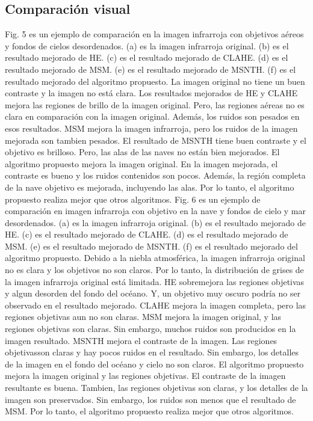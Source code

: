 \documentclass[a4paper, 11 pt, conference]{ieeeconf}      %
\begin{document}
\subsection{Comparaci\'on visual}
Fig. 5 es un ejemplo de comparaci\'on en la imagen infrarroja con objetivos a\'ereos y fondos de cielos desordenados. (a) es la imagen infrarroja original. (b) es el resultado mejorado de HE. (c) es el resultado mejorado de CLAHE. (d) es el resultado mejorado de MSM. (e) es el resultado mejorado de MSNTH. (f) es el resultado mejorado del algoritmo propuesto. La imagen original no tiene un buen contraste y la imagen no est\'a clara. Los resultados mejorados de HE y CLAHE mejora las regiones de brillo de la imagen original. Pero, las regiones a\'ereas no es clara en comparaci\'on con la imagen original. Adem\'as, los ruidos son pesados en esos resultados. MSM mejora la imagen infrarroja, pero los ruidos de la imagen mejorada son tambien pesados. El resultado de MSNTH tiene buen  contraste y el objetivo es brilloso. Pero, las alas de las naves no est\'an bien mejorados. El algoritmo propuesto mejora la imagen original. En la imagen mejorada, el contraste es bueno y los ruidos contenidos son pocos. Adem\'as, la regi\'on completa de la nave objetivo es mejorada, incluyendo las alas. Por lo tanto, el algoritmo propuesto realiza mejor que otros algoritmos.
Fig. 6 es un ejemplo de comparaci\'on en imagen infrarroja con objetivo en la nave y fondos de cielo y mar desordenados. (a) es la imagen infrarroja original. (b) es el resultado mejorado de HE. (c) es el resultado mejorado de CLAHE. (d) es el resultado mejorado de MSM. (e) es el resultado mejorado de MSNTH. (f) es el resultado mejorado del algoritmo propuesto. Debido a la niebla atmosf\'erica, la imagen infrarroja original no es clara y los objetivos no son claros. Por lo tanto, la distribuci\'on de grises de la imagen infrarroja original est\'a limitada. HE sobremejora las regiones objetivas y algun desorden del fondo del oc\'eano. Y, un objetivo muy oscuro podr\'ia no ser observado en el resultado mejorado.  CLAHE mejora la imagen completa, pero las regiones objetivas aun no son claras. MSM mejora la imagen original, y las regiones objetivas son claras. Sin embargo, muchos ruidos son producidos en la imagen resultado. MSNTH mejora el contraste de la imagen. Las regiones objetivasson claras y hay pocos ruidos en el resultado. Sin embargo, los detalles de la imagen en el fondo del oc\'eano y cielo no son claros. El algoritmo propuesto mejora la imagen original y las regiones objetivas.
El contraste de la imagen resultante es buena. Tambien, las regiones objetivas son claras, y los detalles de la imagen son preservados. Sin embargo, los ruidos son menos que el resultado de MSM. Por lo tanto, el algoritmo propuesto realiza mejor que otros algoritmos.
\end{document}
